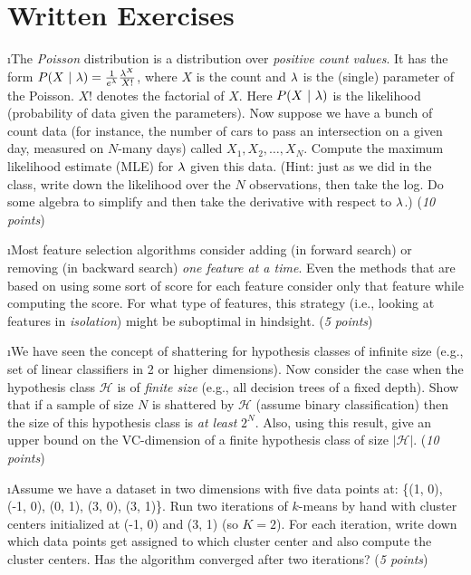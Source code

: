 \documentclass[fleqn]{article}
\begin{document}

\section{Written Exercises}

\bee

\i The \emph{Poisson} distribution is a distribution over
\emph{positive count values}.  It has the form $P(X \textrm{~}\arrowvert\textrm{~} \lambda) = \frac 1
{e^{\lambda}} \frac {\lambda^X} {X!}$, where $X$ is the count and $\lambda$ is the
(single) parameter of the Poisson. $X!$ denotes the factorial of $X$. 
Here $P(X \textrm{~}\arrowvert\textrm{~} \lambda)$ is the likelihood (probability of data given the 
parameters). Now suppose we have a bunch of count data (for 
instance, the number of cars to pass an intersection on a given day, 
measured on $N$-many days) called $X_1, X_2, \dots, X_N$. Compute the 
maximum likelihood estimate (MLE) for $\lambda$ given this data. (Hint: 
just as we did in the class, write down the likelihood over the $N$
observations, then take the log. Do some algebra to simplify and then 
take the derivative with respect to $\lambda$.) (\textit{10 points})

\i Most feature selection algorithms consider adding (in forward search)
or removing (in backward search) \textit{one feature at a time}. Even the
methods that are based on using some sort of score for each feature consider
only that feature while computing the score. For what type of features, this
strategy (i.e., looking at features in \textit{isolation}) might be suboptimal 
in hindsight. (\textit{5 points})

\i We have seen the concept of shattering for hypothesis classes of
infinite size (e.g., set of linear classifiers in 2 or higher dimensions).
Now consider the case when the hypothesis class $\mathcal{H}$ is of \textit{finite 
size} (e.g., all decision trees of a fixed depth). Show that if a sample of
size $N$ is shattered by $\mathcal{H}$ (assume binary classification) then 
the size of this hypothesis class is \textit{at least} $2^N$. Also, using
this result, give an upper bound on the VC-dimension of a finite hypothesis
class of size $|\mathcal{H}|$. (\textit{10 points})  

\i Assume we have a dataset in two dimensions with five data points at: 
\{(1, 0), (-1, 0), (0, 1), (3, 0), (3, 1)\}. Run two iterations of 
$k$-means by hand with cluster centers initialized at (-1, 0) and 
(3, 1) (so $K=2$). For each iteration, write down which data points get
assigned to which cluster center and also compute the cluster centers.
Has the algorithm converged after two iterations? (\textit{5 points})
\end{document}
